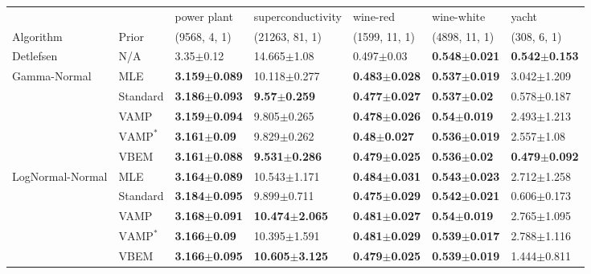 \begin{tabular}{lllllll}
\midrule
                 &      &               power plant &          superconductivity &                  wine-red &                wine-white &                     yacht \\
Algorithm & Prior& (9568, 4, 1)& (21263, 81, 1)& (1599, 11, 1)& (4898, 11, 1)& (308, 6, 1)\\
\midrule
Detlefsen & N/A &             3.35$\pm$0.12 &            14.665$\pm$1.08 &            0.497$\pm$0.03 &  \textbf{0.548$\pm$0.021} &  \textbf{0.542$\pm$0.153} \\
Gamma-Normal & MLE &  \textbf{3.159$\pm$0.089} &           10.118$\pm$0.277 &  \textbf{0.483$\pm$0.028} &  \textbf{0.537$\pm$0.019} &           3.042$\pm$1.209 \\
                 & Standard &  \textbf{3.186$\pm$0.093} &    \textbf{9.57$\pm$0.259} &  \textbf{0.477$\pm$0.027} &   \textbf{0.537$\pm$0.02} &           0.578$\pm$0.187 \\
                 & VAMP &  \textbf{3.159$\pm$0.094} &            9.805$\pm$0.265 &  \textbf{0.478$\pm$0.026} &   \textbf{0.54$\pm$0.019} &           2.493$\pm$1.213 \\
                 & $\text{VAMP}^*$ &   \textbf{3.161$\pm$0.09} &            9.829$\pm$0.262 &   \textbf{0.48$\pm$0.027} &  \textbf{0.536$\pm$0.019} &            2.557$\pm$1.08 \\
                 & VBEM &  \textbf{3.161$\pm$0.088} &   \textbf{9.531$\pm$0.286} &  \textbf{0.479$\pm$0.025} &   \textbf{0.536$\pm$0.02} &  \textbf{0.479$\pm$0.092} \\
LogNormal-Normal & MLE &  \textbf{3.164$\pm$0.089} &           10.543$\pm$1.171 &  \textbf{0.484$\pm$0.031} &  \textbf{0.543$\pm$0.023} &           2.712$\pm$1.258 \\
                 & Standard &  \textbf{3.184$\pm$0.095} &            9.899$\pm$0.711 &  \textbf{0.475$\pm$0.029} &  \textbf{0.542$\pm$0.021} &           0.606$\pm$0.173 \\
                 & VAMP &  \textbf{3.168$\pm$0.091} &  \textbf{10.474$\pm$2.065} &  \textbf{0.481$\pm$0.027} &   \textbf{0.54$\pm$0.019} &           2.765$\pm$1.095 \\
                 & $\text{VAMP}^*$ &   \textbf{3.166$\pm$0.09} &           10.395$\pm$1.591 &  \textbf{0.481$\pm$0.029} &  \textbf{0.539$\pm$0.017} &           2.788$\pm$1.116 \\
                 & VBEM &  \textbf{3.166$\pm$0.095} &  \textbf{10.605$\pm$3.125} &  \textbf{0.479$\pm$0.025} &  \textbf{0.539$\pm$0.019} &           1.444$\pm$0.811 \\
\bottomrule
\end{tabular}

